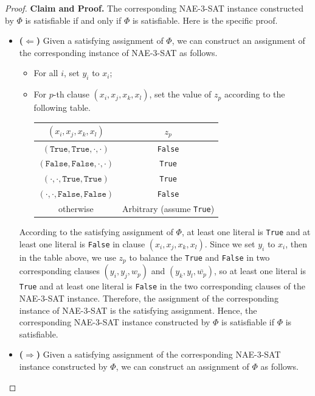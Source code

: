 \documentclass[12pt,a4paper]{article}
\theoremstyle{definition}
\begin{document}
\begin{enumerate}
\begin{proof}
    \textbf{Claim and Proof.} The corresponding NAE-3-SAT instance constructed by $\Phi$ is satisfiable if and only if $\Phi$ is satisfiable. Here is the specific proof.
    \begin{itemize}
    \item \textbf{($\Longleftarrow$)} Given a satisfying assignment of $\Phi$, we can construct an assignment of the corresponding instance of NAE-3-SAT as follows.
        \begin{itemize}
        \item For all $i$, set $y_i$ to $x_i$;
        \item For $p$-th clause $(x_i, x_j, x_k, x_l)$, set the value of $z_p$ according to the following table.
            \begin{table}[h]
        	\centering
        	\label{z-value-table}
        	\begin{tabular}{|c|c|}
            \hline
    		$(x_i, x_j, x_k, x_l)$ & $z_p$ \\ \hline
            $(\texttt{True}, \texttt{True}, \cdot, \cdot)$ & \texttt{False} \\
            $(\texttt{False}, \texttt{False}, \cdot, \cdot)$ & \texttt{True} \\
            $(\cdot, \cdot, \texttt{True}, \texttt{True})$ & \texttt{True} \\
            $(\cdot, \cdot, \texttt{False}, \texttt{False})$ & \texttt{False} \\
            otherwise & Arbitrary (assume \texttt{True}) \\ \hline
    	    \end{tabular}
            \end{table}
        \end{itemize}
        According to the satisfying assignment of $\Phi$, at least one literal is \texttt{True} and at least one literal is \texttt{False} in clause $(x_i, x_j, x_k, x_l)$. Since we set $y_i$ to $x_i$, then in the table above, we use $z_p$ to balance the \texttt{True} and \texttt{False} in two corresponding clauses $(y_i, y_j, w_p)$ and $(y_k, y_l, \overline{w_p})$, so at least one literal is \texttt{True} and at least one literal is \texttt{False} in the two corresponding clauses of the NAE-3-SAT instance. Therefore, the assignment of the corresponding instance of NAE-3-SAT is the satisfying assignment. Hence, the corresponding NAE-3-SAT instance constructed by $\Phi$ is satisfiable if $\Phi$ is satisfiable.
    \item \textbf{($\Longrightarrow$)} Given a satisfying assignment of the corresponding NAE-3-SAT instance constructed by $\Phi$, we can construct an assignment of $\Phi$ as follows.

\end{itemize}
\end{proof}
\end{enumerate}
\end{document}

